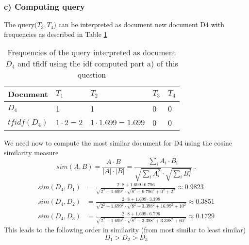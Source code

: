 \documentclass[11pt]{article}
\begin{document}
\subsubsection*{c) Computing query}
The query($T_3, T_4$) can be interpreted as document new document D4 with frequencies
as described in Table \ref{D4}
\begin{table}[h]
\center
\begin{tabular}{|l|l|l|l|l|}
\hline
	Document & $T_1$ & $T_2$ & $T_3$ & $T_4$ \\ 
\hline
	$D_4$ & 1 & 1 & 0 & 0 \\ 
\hline
	$tfidf(D_4)$ & $1 \cdot 2 = 2$ & $1 \cdot 1.699 = 1.699$ & 0 & 0 \\ 
\hline
\end{tabular}
\caption{Frequencies of the query interpreted as document $D_4$ and 
tfidf using the idf computed part a) of this question}
\label{D4}
\end{table}
We need now to compute the most similar document for D4 using the cosine similarity measure
\begin{equation}
	sim(A,B) = \frac{A \cdot B}{|A| \cdot |B|} = \frac{\sum_i A_i \cdot B_i}{\sqrt{\sum_i A_i^2} \cdot \sqrt{\sum_i B_i^2}} \; . 
\end{equation}
\begin{align*}
	sim(D_4, D_1) &= \frac{2 \cdot 8 + 1.699 \cdot 6.796} 
					{\sqrt{2^2 + 1.699^2} \cdot \sqrt{8^2 + 6.796^2 + 0^2 + 2^2}} \approx 0.9823 \\
	sim(D_4, D_2) &= \frac{2 \cdot 8 + 1.699 \cdot 3.398}
					{\sqrt{2^2 + 1.699^2} \cdot \sqrt{8^2 + 3.398^2 + 16.99^2 + 10^2}} \approx 0.3851 \\
	sim(D_4, D_3) &= \frac{2 \cdot 8 + 1.699 \cdot 6.796}
					{\sqrt{2^2 + 1.699^2} \cdot \sqrt{8^2 + 3.398^2 + 3.398^2 + 60^2}} \approx 0.1729
\end{align*}
This leads to the following order in similarity (from most similar to least similar)
\begin{equation}
	D_1 > D_2 > D_3
\end{equation}
\end{document}
